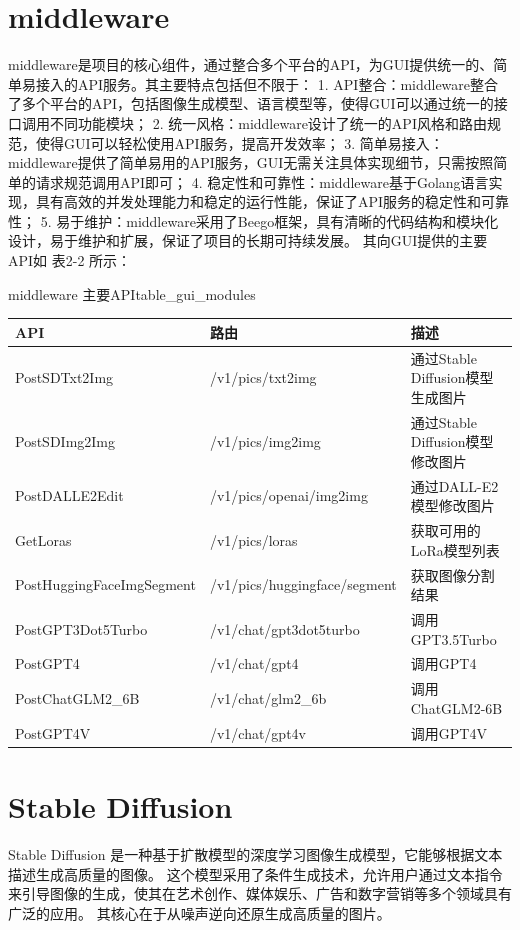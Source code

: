 \documentclass[a4paper,AutoFakeBold,oneside,12pt]{book}
\begin{document}
\section{middleware}
middleware是项目的核心组件，通过整合多个平台的API，为GUI提供统一的、简单易接入的API服务。其主要特点包括但不限于：
1. API整合：middleware整合了多个平台的API，包括图像生成模型、语言模型等，使得GUI可以通过统一的接口调用不同功能模块；
2. 统一风格：middleware设计了统一的API风格和路由规范，使得GUI可以轻松使用API服务，提高开发效率；
3. 简单易接入：middleware提供了简单易用的API服务，GUI无需关注具体实现细节，只需按照简单的请求规范调用API即可；
4. 稳定性和可靠性：middleware基于Golang语言实现，具有高效的并发处理能力和稳定的运行性能，保证了API服务的稳定性和可靠性；
5. 易于维护：middleware采用了Beego框架，具有清晰的代码结构和模块化设计，易于维护和扩展，保证了项目的长期可持续发展。
其向GUI提供的主要API如 表2-2 所示：
\begin{bupttable}{middleware 主要API}{table_gui_modules}
    \begin{tabular}{|l|l|l|}
        \hline \textbf{API} & \textbf{路由} & \textbf{描述} \\
        \hline PostSDTxt2Img & /v1/pics/txt2img & 通过Stable Diffusion模型生成图片  \\
        \hline PostSDImg2Img & /v1/pics/img2img & 通过Stable Diffusion模型修改图片 \\
        \hline PostDALLE2Edit & /v1/pics/openai/img2img & 通过DALL-E2模型修改图片  \\
		\hline GetLoras & /v1/pics/loras & 获取可用的LoRa模型列表  \\
		\hline PostHuggingFaceImgSegment & /v1/pics/huggingface/segment & 获取图像分割结果  \\
		\hline PostGPT3Dot5Turbo & /v1/chat/gpt3dot5turbo & 调用GPT3.5Turbo  \\
		\hline PostGPT4 & /v1/chat/gpt4 & 调用GPT4  \\
		\hline PostChatGLM2\_6B & /v1/chat/glm2\_6b & 调用ChatGLM2-6B  \\
		\hline PostGPT4V & /v1/chat/gpt4v & 调用GPT4V  \\
        \hline
    \end{tabular}
\end{bupttable}

\section{Stable Diffusion}
Stable Diffusion 是一种基于扩散模型的深度学习图像生成模型，它能够根据文本描述生成高质量的图像。
这个模型采用了条件生成技术，允许用户通过文本指令来引导图像的生成，使其在艺术创作、媒体娱乐、广告和数字营销等多个领域具有广泛的应用。
其核心在于从噪声逆向还原生成高质量的图片。
\end{document}
